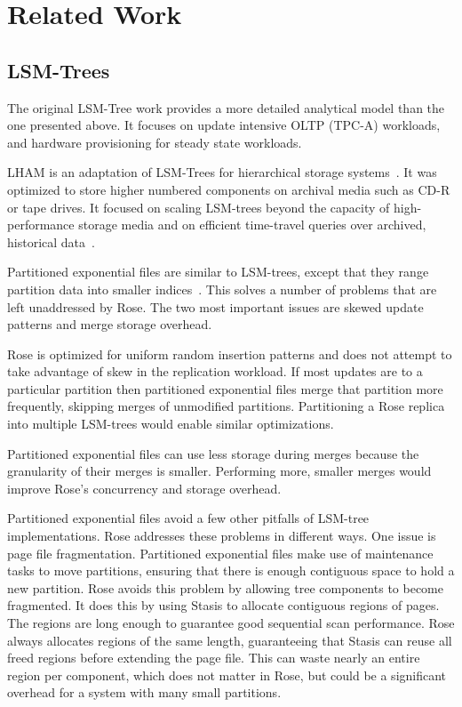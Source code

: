 \documentclass{vldb}
\newcommand{\rows}{Rose\xspace}
\newcommand{\rowss}{Rose's\xspace}
\begin{document}
\section{Related Work}

\subsection{LSM-Trees}

The original LSM-Tree work\cite{lsm} provides a more detailed
analytical model than the one presented above.  It focuses on update
intensive OLTP (TPC-A) workloads, and hardware provisioning for steady
state workloads.

LHAM is an adaptation of LSM-Trees for hierarchical storage
systems~\cite{lham}.  It was optimized to store higher numbered
components on archival media such as CD-R or tape drives.  It focused
on scaling LSM-trees beyond the capacity of high-performance storage
media and on efficient time-travel queries over archived, historical
data~\cite{lham}.

Partitioned exponential files are similar to LSM-trees, except that
they range partition data into smaller indices~\cite{partexp}.  This solves a number
of problems that are left unaddressed by \rows.  The two most
important issues are skewed update patterns and merge storage
overhead.

\rows is optimized for uniform random insertion patterns
and does not attempt to take advantage of skew in the replication
workload.  If most updates are to a particular partition then
partitioned exponential files merge that partition more frequently,
skipping merges of unmodified partitions.  Partitioning a \rows
replica into multiple LSM-trees would enable similar optimizations.

Partitioned exponential files can use less storage during merges
because the granularity of their merges is smaller.  Performing more,
smaller merges would improve \rowss concurrency and storage overhead.

Partitioned exponential files avoid a few other pitfalls of LSM-tree
implementations.  \rows addresses these problems in different ways.
One issue is page file fragmentation.  Partitioned exponential files
make use of maintenance tasks to move partitions, ensuring that there
is enough contiguous space to hold a new partition.  \rows avoids this
problem by allowing tree components to become fragmented.  It does
this by using Stasis to allocate contiguous regions of pages.  The
regions are long enough to guarantee good sequential scan performance.
\rows always allocates regions of the same length, guaranteeing that
Stasis can reuse all freed regions before extending the page file.
This can waste nearly an entire region per component, which does not
matter in \rows, but could be a significant overhead for a system with
many small partitions.
\end{document}
